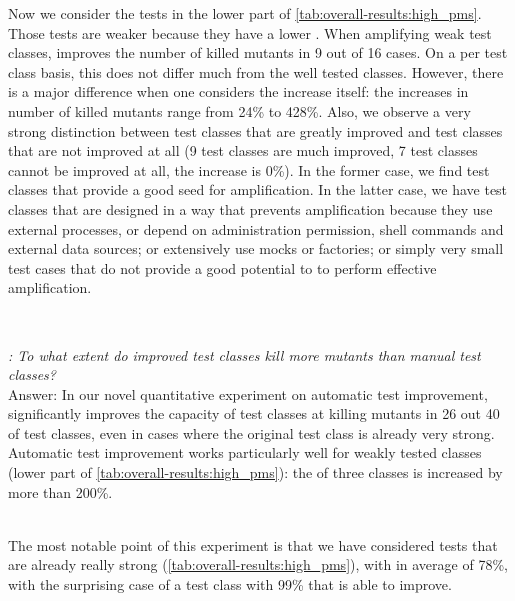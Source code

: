 Now we consider the tests in the lower part of \autoref{tab:overall-results:high_pms}. %
Those tests are weaker because they have a lower \ms. 
When amplifying  weak test classes,  \dspot{} improves the number of killed mutants in  9 out of 16 cases. On a per test class basis, this does not differ much from the well tested classes. However, there is a major difference when one considers the increase itself: the increases in number of killed mutants range from 24\% to 428\%. Also, we observe a very strong distinction between test classes that are greatly improved and test classes that are not improved at all (9 test classes are much improved, 7 test classes cannot be improved at all, the increase is 0\%). In the former case, we find test classes that provide a good seed for amplification. In the latter case, we have test classes that are designed in a way that prevents amplification because they use external processes, or depend on administration permission, shell commands and external data sources; or extensively use mocks or factories; or simply very small test cases that do not provide a good potential to \dspot to perform effective amplification.

~\\
\begin{mdframed}
	\textit{\rqeffectiveness: To what extent do improved  test classes kill more mutants than manual test classes?}\\
	Answer: In our novel quantitative experiment on automatic test improvement, \dspot significantly improves the capacity of test classes at killing mutants in 26 out 40 of test classes, even in cases where the original test class is already very strong. 
	Automatic test improvement works particularly well for weakly tested classes (lower part of \autoref{tab:overall-results:high_pms}): the \ms of three classes is increased by more than 200\%.
\end{mdframed}
~\\
The most notable point of this experiment is that we have considered tests that are already really strong (\autoref{tab:overall-results:high_pms}), with \ms in average of 78\%, with the surprising case of a test class with 99\% \ms that \dspot is able to improve. 


